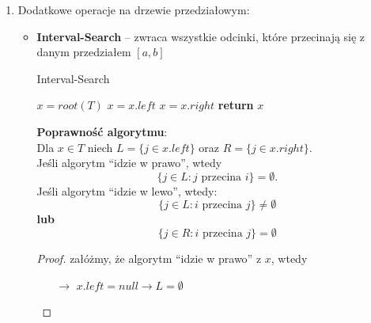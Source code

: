 \documentclass[11pt,a4paper]{article}
\begin{document}
\begin{enumerate}
\begin{center}
        \end{center}
    \item Dodatkowe operacje na drzewie przedziałowym:
        \begin{itemize}
            \item \textbf{Interval-Search} -- zwraca wszystkie odcinki, które przecinają się z danym przedziałem $[a,b]$\\
                \begin{algorithm}
                    \caption{Interval-Search}
                    \begin{algorithmic}[1]
                        \State $x=root(T)$
                         
                            \State $x=x.left$
                            \Else
                            \State $x=x.right$
                        \EndIf
                        \EndWhile
                        \State \textbf{return} $x$
                    \end{algorithmic}
                \end{algorithm}
                \textbf{Poprawność algorytmu}:\\
                Dla $x \in T$ niech $L=\{j \in x.left\}$ oraz $R=\{j \in x.right\}$.\\
                Jeśli algorytm ``idzie w prawo'', wtedy
                \[
                    \{j \in L: j \text{ przecina } i\}=\emptyset.
                \]
                Jeśli algorytm ``idzie w lewo'', wtedy:
                \[
                    \{j \in L: i \text{ przecina } j\}\neq \emptyset
                \]
                \textbf{lub}
                \[
                    \{j \in R: i \text{ przecina } j\}= \emptyset
                \]
                \begin{proof}
                    załóżmy, że algorytm ``idzie w prawo'' z $x$, wtedy
                    \begin{itemize}
                        \item[$\rightarrow$] $x.left=null \rightarrow L=\emptyset$

\end{itemize}
\end{proof}
\end{itemize}
\end{enumerate}
\end{document}
